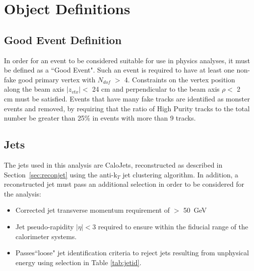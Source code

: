 \section{Object Definitions}
\subsection{Good Event Definition}
\label{sec:good}
In order for an event to be considered suitable for use in physics analyses, it must be defined as a ``Good Event". Such an event is required to have at least one non-fake good primary vertex with $N_{dof}$ $>$ 4. Constraints on the vertex position along the beam axis $|z_{vtx}| <$ 24 cm and perpendicular to the beam axis $\rho <$ 2 cm must be satisfied. Events that have many fake tracks are identified as monster events and removed, by requiring that the ratio of High Purity tracks to the total number be greater than 25\% in events with more than 9 tracks.


\subsection{Jets}
\label{sec:jetsel}
The jets used in this analysis are CaloJets, reconstructed as described in Section~\ref{sec:reconjet} using the anti-k$_{T}$ jet clustering algorithm. In addition, a reconstructed jet must pass an additional selection in order to be considered for the analysis:
\begin{itemize}
\item Corrected jet transverse momentum requirement of \Pt $>$ 50~GeV
\item Jet pseudo-rapidity $|\eta| < 3$ required to ensure within the fiducial range of the calorimeter systems.
\item Passes``loose" jet identification criteria to reject jets resulting from unphysical energy using selection in Table \ref{tab:jetid}.
\end{itemize}

